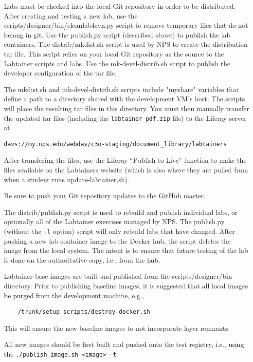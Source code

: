 \documentclass[12pt]{article}
\begin{document}
Labs must be checked into the local Git repository in order to be distributed.  After creating and testing
a new lab, use the scripts/designer/bin/cleanlab4svn.py script to remove temporary files that do not belong in 
git.  Use the publish.py script (described above) to publish the lab containers.
The distrib/mkdist.sh script is used by NPS to create the distribution tar file.  This script relies on
your local Git repository as the source to the Labtainer scripts and labs.  Use the mk-devel-distrib.sh script
to publish the developer configuration of the tar file.  

The mkdist.sh and mk-devel-distrib.sh scripts include "myshare" variables that define a path to a directory
shared with the development VM's host. The scripts will place the resulting tar files in this directory.  You
must then manually transfer the updated tar files (including the {\tt labtainer\_pdf.zip} file) to the Liferay
server at
\begin{verbatim}
davs://my.nps.edu/webdav/c3o-staging/document_library/labtainers
\end{verbatim}
After transfering the files, use the Liferay ``Publish to Live'' function to make the files available on the
Labtainers website (which is also where they are pulled from when a student runs update-labtainer.sh).

Be sure to push your Git repository updates to the GitHub master.

The distrib/publish.py script is used to rebuild and 
publish individual labs, or optionally all of the Labtainer exercises managed by NPS.
The publish.py (without the {\tt -l} option) script will only rebuild labs that have changed.  After pushing a new lab container
image to the Docker hub, the script deletes the image from the local system.  The intent is to
ensure that future testing of the lab is done on the authoritative copy, i.e., from the hub.

Labtainer base images are built and published from the scripts/designer/bin directory.  Prior to publishing
baseline images, it is suggested that all local images be purged from the development machine, e,g.,
\begin{verbatim}
    /trunk/setup_scripts/destroy-docker.sh
\end{verbatim}
\noindent This will ensure the new baseline images to not incorporate layer remnants.

All new images should be first built and pushed onto the test registry, i.e., using the 
{\tt ./publish\_image.sh <image> -t}
\end{document}
